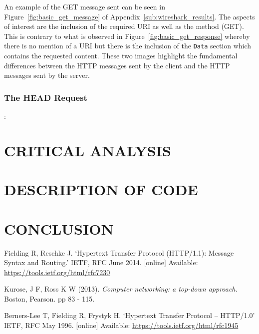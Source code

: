 \documentclass[10pt,twocolumn]{witseiepaper}
\begin{document}
		An example of the GET message sent can be seen in Figure~\ref{fig:basic_get_message} of Appendix~\ref{sub:wireshark_results}. The aspects of interest are the inclusion of the required URI as well as the method (GET). This is contrary to what is observed in Figure~\ref{fig:basic_get_response} whereby there is no mention of a URI but there is the inclusion of the \texttt{Data} section which contains the requested content. These two images highlight the fundamental differences between the HTTP messages sent by the client and the HTTP messages sent by the server.
		
		\subsubsection*{The HEAD Request}: 
\section{CRITICAL ANALYSIS}

\section{DESCRIPTION OF CODE}




\section{CONCLUSION}


\begin{thebibliography}{1}

 Fielding R, Reschke J. `Hypertext Transfer Protocol (HTTP/1.1): Message Syntax and Routing.' IETF, RFC June 2014. [online] Available: \url{https://tools.ietf.org/html/rfc7230}

 Kurose, J F, Ross K W (2013). \emph{Computer networking: a top-down approach.} Boston, Pearson. pp 83 - 115.

 Berners-Lee T, Fielding R, Frystyk H. `Hypertext Transfer Protocol -- HTTP/1.0' IETF, RFC May 1996. [online] Available: \url{https://tools.ietf.org/html/rfc1945}

\end{thebibliography}
\end{document}
